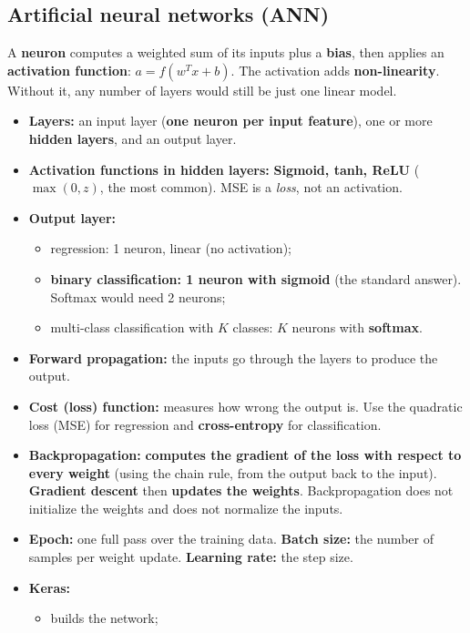 \subsection{Artificial neural networks (ANN)}
\begin{idea}
A \textbf{neuron} computes a weighted sum of its inputs plus a \textbf{bias}, then applies an \textbf{activation function}: $a = f(w^Tx + b)$.
The activation adds \textbf{non-linearity}. Without it, any number of layers would still be just one linear model.
\end{idea}
\begin{itemize}
  \item \textbf{Layers:} an input layer (\textbf{one neuron per input feature}), one or more \textbf{hidden layers}, and an output layer.
  \item \textbf{Activation functions in hidden layers:} \textbf{Sigmoid, tanh, ReLU} ($\max(0,z)$, the most common). MSE is a \emph{loss}, not an activation.
  \item \textbf{Output layer:}
  \begin{itemize}
    \item regression: 1 neuron, linear (no activation);
    \item \textbf{binary classification: 1 neuron with sigmoid} (the standard answer). Softmax would need 2 neurons;
    \item multi-class classification with $K$ classes: $K$ neurons with \textbf{softmax}.
  \end{itemize}
  \item \textbf{Forward propagation:} the inputs go through the layers to produce the output.
  \item \textbf{Cost (loss) function:} measures how wrong the output is. Use the quadratic loss (MSE) for regression and \textbf{cross-entropy} for classification.
  \item \textbf{Backpropagation:} \textbf{computes the gradient of the loss with respect to every weight} (using the chain rule, from the output back to the input). \textbf{Gradient descent} then \textbf{updates the weights}. Backpropagation does not initialize the weights and does not normalize the inputs.
  \item \textbf{Epoch:} one full pass over the training data. \textbf{Batch size:} the number of samples per weight update. \textbf{Learning rate:} the step size.
  \item \textbf{Keras:}
  \begin{itemize}
    \item {} builds the network;

\end{itemize}
\end{itemize}
